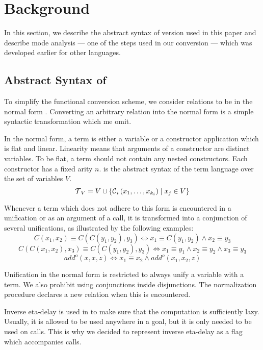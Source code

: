 \section{Background}

In this section, we describe the abstract syntax of \mk version used in this paper and describe mode analysis --- one of the steps used in our conversion --- which was developed earlier for other languages.  

\subsection{Abstract Syntax of \mk}

To simplify the functional conversion scheme, we consider \mk relations to be in the normal form .  
Converting an arbitrary \mk relation into the normal form is a simple syntactic transformation which me omit. 

In the normal form, a term is either a variable or a constructor application which is flat and linear. 
Linearity means that arguments of a constructor are distinct variables. 
To be flat, a term should not contain any nested constructors. 
Each constructor has a fixed arity $n$. 
 is the abstract syntax of the term language over the set of variables $V$. 
\[  \operatorname{\mathcal{T}}_{V} = V \cup \{\operatorname{\mathcal{C}}_{i}\left( x_1, \ldots, x_{k_{i}} \right) \mid x_{j}\in V\} \]

Whenever a term which does not adhere to this form is encountered in a unification or as an argument of a call, it is transformed into a conjunction of several unifications, as illustrated by the following examples: 
\[ C\left( x_1, x_2 \right) \equiv C\left( C\left( y_1, y_2 \right), y_3 \right) \iff x_1 \equiv C\left( y_1, y_2 \right) \land x_2 \equiv y_3   \]
\[ C\left( C\left( x_1, x_2 \right), x_3 \right) \equiv C\left( C\left( y_1, y_2 \right), y_3 \right) \iff x_1 \equiv y_1 \land x_2 \equiv y_2 \land x_3 \equiv y_3   \]
\[add^o\left( x, x, z \right) \iff x_1 \equiv x_2 \land add^o\left( x_1, x_2, z \right) \]

Unification in the normal form is restricted to always unify a variable with a term. 
We also prohibit using conjunctions inside disjunctions. 
The normalization procedure declares a new relation when this is encountered. 

Inverse eta-delay is used in \mk to make sure that the computation is sufficiently lazy. 
Usually, it is allowed to be used anywhere in a goal, but it is only needed to be used on calls. 
This is why we decided to represent inverse eta-delay as a flag which accompanies calls. 


